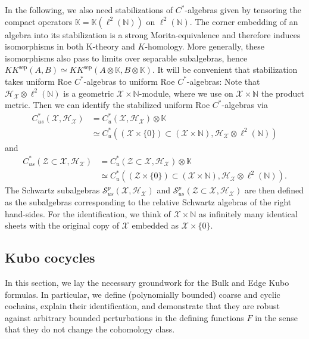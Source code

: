 \documentclass[12pt]{amsart}
\newcommand{\NM}{{\mathbb N}}
\newcommand{\KM}{{\mathbb K}}
\newcommand{\Ss}{{\mathcal S}}
\newcommand{\Hh}{{\mathcal H}}
\newcommand{\Xx}{{\mathcal X}}
\newcommand{\Zz}{{\mathcal Z}}
\begin{document}
In the following, we also need stabilizations of $C^*$-algebras given by tensoring the compact operators $\KM=\KM(\ell^2(\NM))$ on $\ell^2(\NM)$. The corner embedding of an algebra into its stabilization is a strong Morita-equivalence and therefore induces isomorphisms in both K-theory and $K$-homology. 
More generally, these isomorphisms also pass to limits over separable subalgebras, hence $KK^{\mathrm{sep}}(A,B)\simeq KK^{\mathrm{sep}}(A\otimes \KM, B \otimes \KM)$. It will be convenient that stabilization takes uniform Roe $C^*$-algebras to uniform Roe $C^*$-algebras: Note that $\Hh_\Xx\otimes \ell^2(\NM)$ is a geometric $\Xx\times\NM$-module, where we use on $\Xx\times \NM$ the product metric.
Then we can identify the stabilized uniform Roe $C^*$-algebras via
\begin{align*}
    C^*_{us}(\Xx, \Hh_\Xx)&= C^*_u(\Xx, \Hh_\Xx)\otimes \KM \\
    &\simeq C^*_u( (\Xx \times \{0\})\subset (\Xx\times \NM), \Hh_\Xx \otimes \ell^2(\NM))
\end{align*}
and
\begin{align*}
C^*_{us}(\Zz\subset \Xx, \Hh_\Xx) &= C^*_{u}(\Zz\subset \Xx, \Hh_\Xx)\otimes \KM \\
&\simeq C^*_{u}( (\Zz\times \{0\})\subset (\Xx\times \NM), \Hh_\Xx \otimes \ell^2(\NM)).
\end{align*}
The Schwartz subalgebras $\Ss^p_{us}(\Xx, \Hh_\Xx)$ and $\Ss^p_{us}(\Zz\subset \Xx, \Hh_\Xx)$ are then defined as the subalgebras corresponding to the relative Schwartz algebras of the right hand-sides. For the identification, we think of $\Xx\times \NM$ as infinitely many identical sheets with the original copy of $\Xx$ embedded as $\Xx\times \{0\}$.



\subsection{Kubo cocycles}\label{subsec:cocycle_definitions}

In this section, we lay the necessary groundwork for the Bulk and Edge Kubo formulas.
In particular, we define (polynomially bounded) coarse and cyclic cochains, explain their identification, and demonstrate that they are robust against arbitrary bounded perturbations in the defining functions $F$ in the sense that they do not change the cohomology class.
\end{document}
